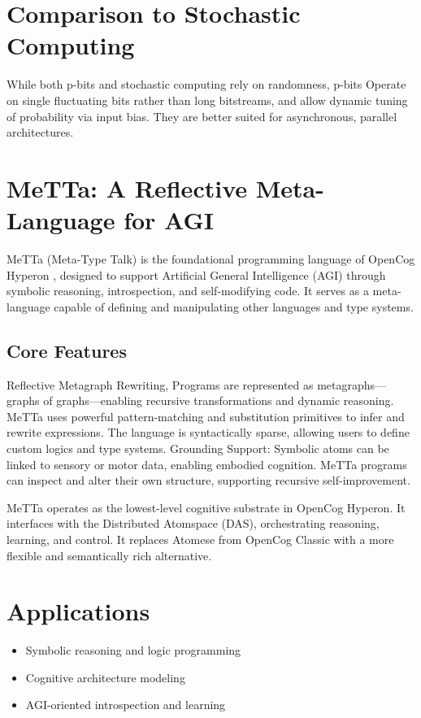 \documentclass{article}
\begin{document}
\section{Comparison to Stochastic Computing}
While both p-bits and stochastic computing rely on randomness, p-bits  Operate on single fluctuating bits rather than long bitstreams, and allow dynamic tuning of probability via input bias. They are better suited for asynchronous, parallel architectures.

\section{MeTTa: A Reflective Meta-Language for AGI}

MeTTa (Meta-Type Talk) \cite{goertzel2021metagraph} \cite{singularitynet2024mett} is the foundational programming language of OpenCog Hyperon \cite{opencogHyperon}, designed to support Artificial General Intelligence (AGI) through symbolic reasoning, introspection, and self-modifying code. It serves as a meta-language capable of defining and manipulating other languages and type systems.


\subsection{Core Features}

Reflective Metagraph Rewriting, Programs are represented as metagraphs---graphs of graphs---enabling recursive transformations and dynamic reasoning. MeTTa uses powerful pattern-matching and substitution primitives to infer and rewrite expressions. The language is syntactically sparse, allowing users to define custom logics and type systems. Grounding Support: Symbolic atoms can be linked to sensory or motor data, enabling embodied cognition.
 MeTTa programs can inspect and alter their own structure, supporting recursive self-improvement.

MeTTa operates as the lowest-level cognitive substrate in OpenCog Hyperon. It interfaces with the Distributed Atomspace (DAS), orchestrating reasoning, learning, and control. It replaces Atomese from OpenCog Classic with a more flexible and semantically rich alternative.

\section*{Applications}
\begin{itemize}
  \item Symbolic reasoning and logic programming
  \item Cognitive architecture modeling
  \item AGI-oriented introspection and learning
\end{itemize}
\end{document}
